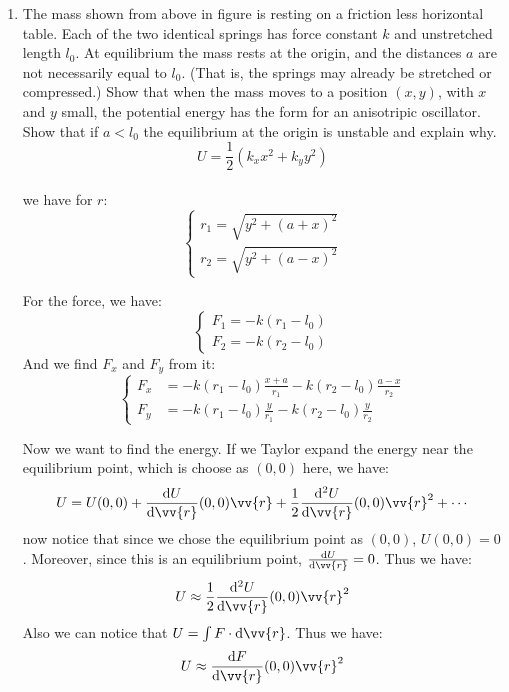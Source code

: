 \documentclass{article}
\newcommand{\de}{\mathrm{d}}
\begin{document}
\begin{enumerate}
\begin{enumerate}
    \end{enumerate}
    \item The mass shown from above in figure is resting on a friction less horizontal table. Each of the two identical springs has force constant $k$ and unstretched length $l_0$. At equilibrium the mass rests at the origin, and the distances $a$ are not necessarily equal to $l_0$. (That is, the springs may already be stretched or compressed.) Show that when the mass moves to a position $(x,y)$, with $x$ and $y$ small, the potential energy has the form for an anisotripic oscillator. Show that if $a < l_0$ the equilibrium at the origin is unstable and explain why.
    \[
    U = \frac{1}{2}(k_xx^2 + k_yy^2)
    \]\\

    we have for $r$:
    \[
    \left\{
    \begin{aligned}
    r_1 = \sqrt{y^2 + (a+x)^2} \\
    r_2 = \sqrt{y^2 + (a-x)^2}
    \end{aligned}
    \right. 
    \] 

    For the force, we have:
    \[
    \left\{
    \begin{aligned}
    F_1 = -k(r_1 - l_0) \\
    F_2 = -k(r_2 - l_0)
    \end{aligned}
    \right. 
    \] 
    And we find $F_x$ and $F_y$ from it:
    \[
    \left\{
    \begin{aligned}
    F_x &= -k(r_1-l_0)\frac{x+a}{r_1} - k(r_2 - l_0)\frac{a-x}{r_2} \\
    F_y &= -k(r_1-l_0)\frac{y}{r_1} - k(r_2-l_0)\frac{y}{r_2}
    \end{aligned}
    \right. 
    \] 

    Now we want to find the energy. If we Taylor expand the energy near the equilibrium point, which is choose as $(0,0)$ here, we have:
    \[
    U = U(0,0) + \frac{\de U}{\de \vv{r}}(0,0) \vv{r} + \frac{1}{2}\frac{\de^2 U}{\de \vv{r}} (0,0)\vv{r}^2 + \cdots
    \]
    now notice that since we chose the equilibrium point as $(0,0)$, $U(0,0) = 0$. Moreover, since this is an equilibrium point, $\frac{\de U}{\de \vv{r}} = 0$. Thus we have:
    \[
    U \approx \frac{1}{2}\frac{\de^2 U}{\de \vv{r}} (0,0)\vv{r}^2
    \]
    Also we can notice that $U = \int F \cdot \de \vv{r}$. Thus we have:
    \[
    U \approx \frac{\de F}{\de \vv{r}}(0,0) \vv{r}^2
    \]


\end{enumerate}
\end{document}
